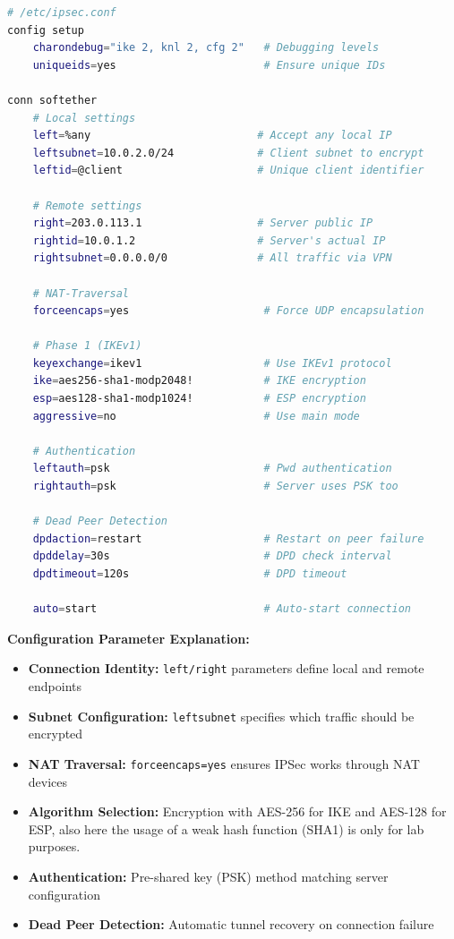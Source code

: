 \begin{lstlisting}[language=bash]
# /etc/ipsec.conf
config setup
    charondebug="ike 2, knl 2, cfg 2"   # Debugging levels
    uniqueids=yes                       # Ensure unique IDs

conn softether
    # Local settings
    left=%any                          # Accept any local IP
    leftsubnet=10.0.2.0/24             # Client subnet to encrypt
    leftid=@client                     # Unique client identifier
    
    # Remote settings  
    right=203.0.113.1                  # Server public IP
    rightid=10.0.1.2                   # Server's actual IP
    rightsubnet=0.0.0.0/0              # All traffic via VPN
    
    # NAT-Traversal
    forceencaps=yes                     # Force UDP encapsulation
    
    # Phase 1 (IKEv1)
    keyexchange=ikev1                   # Use IKEv1 protocol
    ike=aes256-sha1-modp2048!           # IKE encryption
    esp=aes128-sha1-modp1024!           # ESP encryption
    aggressive=no                       # Use main mode
    
    # Authentication
    leftauth=psk                        # Pwd authentication
    rightauth=psk                       # Server uses PSK too
    
    # Dead Peer Detection
    dpdaction=restart                   # Restart on peer failure
    dpddelay=30s                        # DPD check interval
    dpdtimeout=120s                     # DPD timeout
    
    auto=start                          # Auto-start connection
\end{lstlisting}

\noindent
\textbf{Configuration Parameter Explanation:}

\begin{itemize}
    \item \textbf{Connection Identity:} \texttt{left/right} parameters define local and remote endpoints
    \item \textbf{Subnet Configuration:} \texttt{leftsubnet} specifies which traffic should be encrypted
    \item \textbf{NAT Traversal:} \texttt{forceencaps=yes} ensures IPSec works through NAT devices
    \item \textbf{Algorithm Selection:} Encryption with AES-256 for IKE and AES-128 for ESP, also here the usage of a weak hash function (SHA1) is only for lab purposes.
    \item \textbf{Authentication:} Pre-shared key (PSK) method matching server configuration
    \item \textbf{Dead Peer Detection:} Automatic tunnel recovery on connection failure
\end{itemize}

